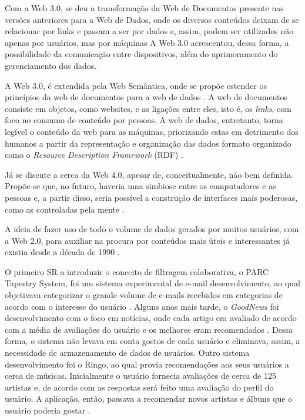 Com a Web 3.0, se deu a transformação da Web de Documentos presente nas versões anteriores para a Web de Dados, onde os diversos conteúdos deixam de se relacionar por links e passam a ser por dados e, assim, podem ser utilizados não apenas por usuários, mas por máquinas
A Web 3.0 acrescentou, dessa forma, a possibilidade da comunicação entre dispositivos, além do aprimoramento do gerenciamento dos dados. 

A Web 3.0, é extendida pela Web Semântica, onde se propõe estender os princípios da web de documentos para a web de dados \cite{Nath2014}. 
A web de documentos consiste em objetos, como websites, e as ligações entre eles, isto é, os \textit{links}, com foco no consumo de conteúdo por pessoas. A web de dados, entretanto, torna legível o conteúdo da web para as máquinas, priorizando estas em detrimento dos humanos a partir da representação e organização das dados formato organizado como o \textit{Resource Description Framework} (RDF) \cite{Aghaei2012}.

Já se discute a cerca da Web 4.0, apesar de, conceitualmente, não bem definida. Propõe-se que, no futuro, haveria uma simbiose entre os computadores e as pessoas e, a partir disso, seria possível a construção de interfaces mais poderosas, como as controladas pela mente \cite{Aghaei2012}.

A ideia de fazer uso de todo o volume de dados gerados por muitos usuários, com a Web 2.0, para auxiliar na procura por conteúdos mais úteis e interessantes já existia desde a década de 1990 \cite{Jannach2010}.

O primeiro SR a introduzir o conceito de filtragem colaborativa, o PARC Tapestry System, foi um sistema experimental de e-mail desenvolvimento, ao qual objetivava categorizar o grande volume de e-mails recebidos em categorias de acordo com o interesse do usuário \cite{Goldberg1992}.
Alguns anos mais tarde, o \textit{GoodNews} foi desenvolvimento com o foco em notícias, onde cada artigo era avaliado de acordo com a média de avaliações do usuário e os melhores eram recomendados . Dessa forma, o sistema não levava em conta gostos de cada usuário e eliminava, assim, a necessidade de armazenamento de dados de usuários.
Outro sistema desenvolvimento foi o Ringo, ao qual provia recomendações aos seus usuários a cerca de músicas. Inicialmente o usuário fornecia avaliações de cerca de 125 artistas e, de acordo com as respostas será feito uma avaliação do perfil do usuário.  A aplicação, então, passava a recomendar novos artistas e álbuns que o usuário poderia gostar \cite{Resnick1994}.

